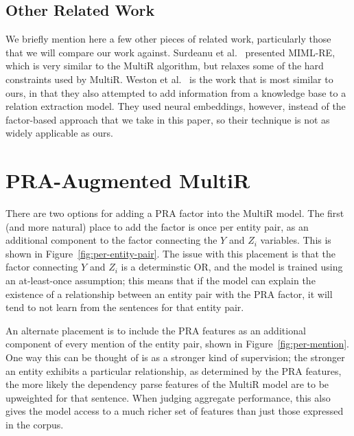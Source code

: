 \documentclass[11pt,a4paper]{article}
\newcommand{\figref}[1]{Figure~\ref{fig:#1}}
\begin{document}
\subsection{Other Related Work}
\label{sec:related-work}

We briefly mention here a few other pieces of related work, particularly those
that we will compare our work against.  Surdeanu et
al.~ presented MIML-RE, which is
very similar to the MultiR algorithm, but relaxes some of the hard constraints
used by MultiR.  Weston et
al.~ is the work that is most
similar to ours, in that they also attempted to add information from a
knowledge base to a relation extraction model.  They used neural embeddings,
however, instead of the factor-based approach that we take in this paper, so
their technique is not as widely applicable as ours.

\section{PRA-Augmented MultiR}
\label{sec:pra-augmented-multir}

There are two options for adding a PRA factor into the MultiR model.  The first
(and more natural) place to add the factor is once per entity pair, as an
additional component to the factor connecting the $Y$ and $Z_i$ variables.
This is shown in \figref{per-entity-pair}.  The issue with this placement is
that the factor connecting $Y$ and $Z_i$ is a determinstic OR, and the model is
trained using an at-least-once assumption; this means that if the model can
explain the existence of a relationship between an entity pair with the PRA
factor, it will tend to not learn from the sentences for that entity pair.

An alternate placement is to include the PRA features as an additional
component of every mention of the entity pair, shown in \figref{per-mention}.
One way this can be thought of is as a stronger kind of supervision; the
stronger an entity exhibits a particular relationship, as determined by the PRA
features, the more likely the dependency parse features of the MultiR model are
to be upweighted for that sentence.  When judging aggregate performance, this
also gives the model access to a much richer set of features than just those
expressed in the corpus.
\end{document}
